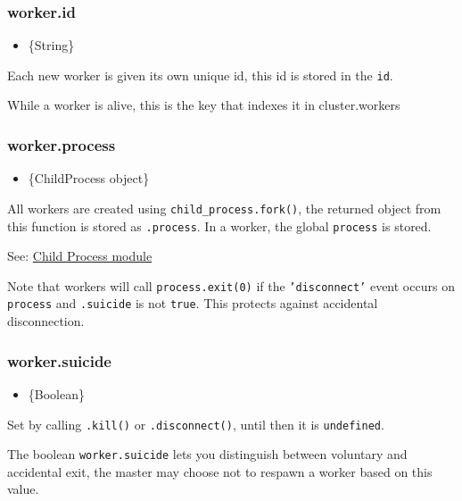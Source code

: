 \subsubsection{worker.id}\label{worker.id}

\begin{itemize}
\itemsep1pt\parskip0pt
\item
  \{String\}
\end{itemize}

Each new worker is given its own unique id, this id is stored in the
\texttt{id}.

While a worker is alive, this is the key that indexes it in
cluster.workers

\subsubsection{worker.process}\label{worker.process}

\begin{itemize}
\itemsep1pt\parskip0pt
\item
  \{ChildProcess object\}
\end{itemize}

All workers are created using \texttt{child\_process.fork()}, the
returned object from this function is stored as \texttt{.process}. In a
worker, the global \texttt{process} is stored.

See:
\href{child_process.html\#child_process_child_process_fork_modulepath_args_options}{Child
Process module}

Note that workers will call \texttt{process.exit(0)} if the
\texttt{'disconnect'} event occurs on \texttt{process} and
\texttt{.suicide} is not \texttt{true}. This protects against accidental
disconnection.

\subsubsection{worker.suicide}\label{worker.suicide}

\begin{itemize}
\itemsep1pt\parskip0pt
\item
  \{Boolean\}
\end{itemize}

Set by calling \texttt{.kill()} or \texttt{.disconnect()}, until then it
is \texttt{undefined}.

The boolean \texttt{worker.suicide} lets you distinguish between
voluntary and accidental exit, the master may choose not to respawn a
worker based on this value.

